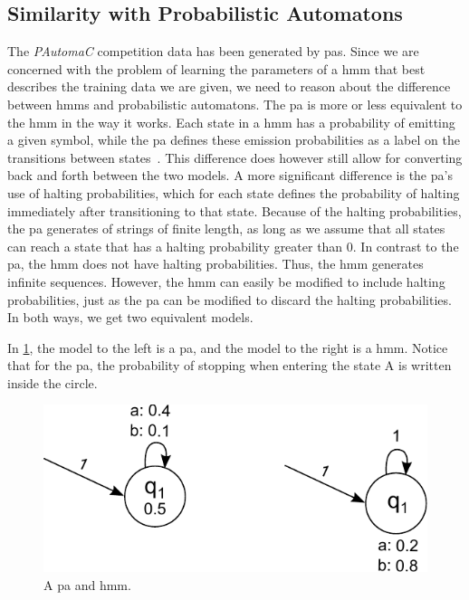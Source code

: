 \subsection{Similarity with Probabilistic Automatons}
\label{sec:hmm_vs_pa}
The \emph{PAutomaC} competition data has been generated by \gls{pa}s. Since we are concerned with the problem of learning the parameters of a \gls{hmm} that best describes the training data we are given, we need to reason about the difference between \gls{hmm}s and probabilistic automatons. The \gls{pa} is more or less equivalent to the \gls{hmm} in the way it works. Each state in a \gls{hmm} has a probability of emitting a given symbol, while the \gls{pa} defines these emission probabilities as a label on the transitions between states~\cite{pautomacTR}. This difference does however still allow for converting back and forth between the two models.
A more significant difference is the \gls{pa}'s use of halting probabilities, which for each state defines the probability of halting immediately after transitioning to that state. Because of the halting probabilities, the \gls{pa} generates of strings of finite length, as long as we assume that all states can reach a state that has a halting probability greater than 0. In contrast to the \gls{pa}, the \gls{hmm} does not have halting probabilities. Thus, the \gls{hmm} generates infinite sequences. However, the \gls{hmm} can easily be modified to include halting probabilities, just as the \gls{pa} can be modified to discard the halting probabilities. In both ways, we get two equivalent models.

In \ref{fig:model-with-and-without-stop-symbols}, the model to the left is a \gls{pa}, and the model to the right is a \gls{hmm}.
Notice that for the \gls{pa}, the probability of stopping when entering the state A is written inside the circle.

\begin{figure}
\begin{centering}
\includegraphics[scale=1]{./pictures/model-with-and-without-stop-symbols.pdf}
\caption{A \gls{pa} and \gls{hmm}.}
\label{fig:model-with-and-without-stop-symbols}
\end{centering}
\end{figure}

